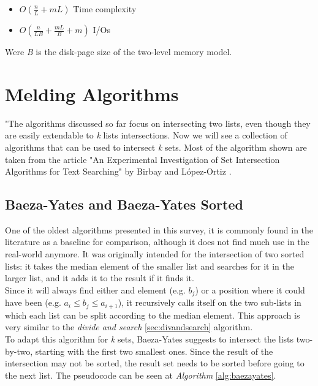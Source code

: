 \begin{itemize}
    \item $O \left( \frac{n}{L} +mL \right)$ Time complexity
    \item $O \left( \frac{n}{LB} + \frac{mL}{B} +m \right)$ I/Os 
\end{itemize}

Were \textit{B} is the disk-page size of the two-level memory model.

\section{Melding Algorithms}

"The algorithms discussed so far focus on intersecting two lists, even though they are easily extendable to \textit{k} lists intersections. Now we will see a collection of algorithms that can be used to intersect \textit{k} sets. Most of the algorithm shown are taken from the article "An Experimental Investigation of Set Intersection Algorithms for Text Searching" by Birbay and López-Ortiz \citep{birbay_ortiz}.

\subsection{Baeza-Yates and Baeza-Yates Sorted \label{sec:baezayates}}

One of the oldest algorithms presented in this survey, it is commonly found in the literature as a baseline for comparison, although it does not find much use in the real-world anymore. It was originally intended for the intersection of two sorted lists: it takes the median element of the smaller list and searches for it in the larger list, and it adds it to the result if it finds it.\\   
Since it will always find either and element (e.g. $b_j$) or a position where it could have been (e.g. $a_i \leq b_j \leq a_{i+1}$), it recursively calls itself on the two sub-lists in which each list can be split according to the median element. This approach is very similar to the \textit{divide and search} \ref{sec:divandsearch} algorithm.\\
To adapt this algorithm for \textit{k} sets, Baeza-Yates suggests to intersect the lists two-by-two, starting with the first two smallest ones. Since the result of the intersection may not be sorted, the result set needs to be sorted before going to the next list. The pseudocode can be seen at \textit{Algorithm} \ref{alg:baezayates}.


